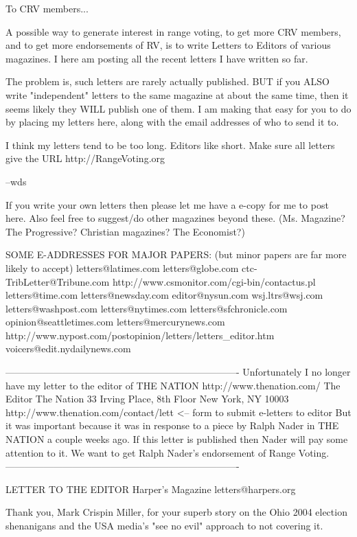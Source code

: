 To CRV members...

A possible way to generate interest in range voting, to get more CRV members, and to get
more endorsements of RV, is to write Letters to Editors of various magazines.
I here am posting all the recent letters I have written so far.  

The problem is, such letters are rarely actually published.  BUT if you ALSO write
"independent" letters to the same magazine at about the same time, then it seems likely 
they WILL publish one of them.  I am making that easy for you to do by placing my 
letters here, along with the email addresses of who to send it to.

I think my letters tend to be too long.  Editors like short.
Make sure all letters give the URL    http://RangeVoting.org

--wds

If you write your own letters then please let me have a e-copy for me to post here.
Also feel free to suggest/do other magazines beyond these.
(Ms. Magazine?   The Progressive?   Christian magazines?  The Economist?)

SOME E-ADDRESSES FOR MAJOR PAPERS:  (but minor papers are far more likely to accept)
letters@latimes.com
letters@globe.com
ctc-TribLetter@Tribune.com
http://www.csmonitor.com/cgi-bin/contactus.pl
letters@time.com
letters@newsday.com
editor@nysun.com
wsj.ltrs@wsj.com
letters@washpost.com
letters@nytimes.com
letters@sfchronicle.com
opinion@seattletimes.com
letters@mercurynews.com
http://www.nypost.com/postopinion/letters/letters_editor.htm
voicers@edit.nydailynews.com

-------------------------------------------------------------------------
Unfortunately I no longer have my letter to the editor of THE NATION
   http://www.thenation.com/
The Editor   The Nation 
33 Irving Place, 8th Floor 
New York, NY 10003
   http://www.thenation.com/contact/lett   <-- form to submit e-letters to editor
But it was important because it was in response to a piece by Ralph Nader in
THE NATION a couple weeks ago.  If this letter is published then Nader will
pay some attention to it.  We want to get Ralph Nader's endorsement of Range Voting.
-------------------------------------------------------------------------

LETTER TO THE EDITOR Harper's Magazine   letters@harpers.org

Thank you, Mark Crispin Miller, for your superb story
on the Ohio 2004 election shenanigans and the USA media's "see no evil" 
approach to not covering it.


